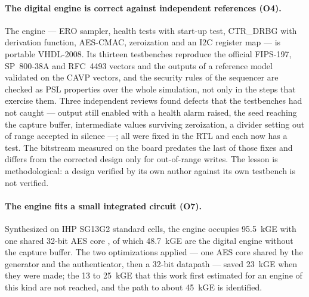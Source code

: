 \paragraph{The digital engine is correct against independent references
(O4).} The engine --- \ac{ERO} sampler, health tests with start-up test,
CTR\_DRBG with derivation function, AES-CMAC, zeroization and an I2C
register map --- is portable VHDL-2008. Its thirteen testbenches
reproduce the official FIPS-197, SP~800-38A and RFC~4493 vectors and the
outputs of a reference model validated on the \ac{CAVP} vectors, and the
security rules of the sequencer are checked as \ac{PSL} properties over
the whole simulation, not only in the steps that exercise them. Three
independent reviews found defects that the testbenches had not caught ---
output still enabled with a health alarm raised, the seed reaching the
capture buffer, intermediate values surviving zeroization, a divider
setting out of range accepted in silence ---; all were fixed in the
\ac{RTL} and each now has a test. The bitstream measured on the board
predates the last of those fixes and differs from the corrected design
only for out-of-range writes. The lesson is methodological: a design
verified by its own author against its own testbench is not verified.

\paragraph{The engine fits a small integrated circuit (O7).} Synthesized
on IHP SG13G2 standard cells, the engine occupies 95.5~kGE with one shared
32-bit AES core \simu{}, of which 48.7~kGE are the digital engine
without the capture buffer. The two optimizations applied --- one AES core
shared by the generator and the authenticator, then a 32-bit datapath ---
saved 23~kGE when they were made; the 13 to 25~kGE that this work first
estimated for an engine of this kind are not reached, and the path to
about 45~kGE is identified.

